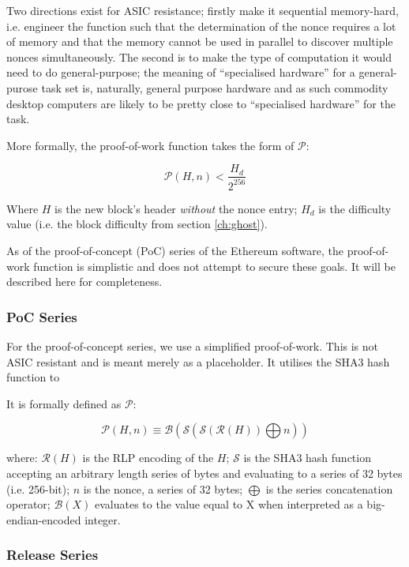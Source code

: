 \documentclass[9pt,oneside]{amsart}
\begin{document}
\begin{multicols}{2}
Two directions exist for ASIC resistance; firstly make it sequential memory-hard, i.e. engineer the function such that the determination of the nonce requires a lot of memory and that the memory cannot be used in parallel to discover multiple nonces simultaneously. The second is to make the type of computation it would need to do general-purpose; the meaning of ``specialised hardware''  for a general-purose task set is, naturally, general purpose hardware and as such commodity desktop computers are likely to be pretty close to ``specialised hardware'' for the task. 

More formally, the proof-of-work function takes the form of $\mathcal{P}$:

\begin{equation}
\mathcal{P}(H, n) < \frac{H_d}{2^{256}}
\end{equation}

Where $H$ is the new block's header \textit{without} the nonce entry; $H_d$ is the difficulty value (i.e. the block difficulty from section \ref{ch:ghost}).

As of the proof-of-concept (PoC) series of the Ethereum software, the proof-of-work function is simplistic and does not attempt to secure these goals. It will be described here for completeness.

\subsubsection{PoC Series}

For the proof-of-concept series, we use a simplified proof-of-work. This is not ASIC resistant and is meant merely as a placeholder. It utilises the SHA3 hash function to 

It is formally defined as $\mathcal{P}$:

\begin{equation}
\mathcal{P}(H, n) \equiv \mathcal{B}(\mathcal{S}(\mathcal{S}(\mathcal{R}(H)) \bigoplus n))
\end{equation}

where:
$\mathcal{R}(H)$ is the RLP encoding of the $H$;
$\mathcal{S}$ is the SHA3 hash function accepting an arbitrary length series of bytes and evaluating to a series of 32 bytes (i.e. 256-bit);
$n$ is the nonce, a series of 32 bytes;
$\bigoplus$ is the series concatenation operator;
$\mathcal{B}(X)$ evaluates to the value equal to X when interpreted as a big-endian-encoded integer.

\subsubsection{Release Series}


\end{multicols}
\end{document}
